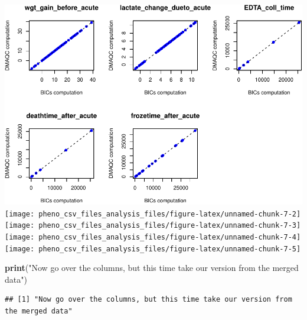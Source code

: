 \documentclass[]{article}
\newenvironment{Shaded}{\begin{snugshade}}{\end{snugshade}}
\newcommand{\KeywordTok}[1]{\textcolor[rgb]{0.13,0.29,0.53}{\textbf{#1}}}
\newcommand{\StringTok}[1]{\textcolor[rgb]{0.31,0.60,0.02}{#1}}
\newcommand{\NormalTok}[1]{#1}
\begin{document}
\includegraphics[width=0.5\linewidth,height=0.5\textheight]{pheno_csv_files_analysis_files/figure-latex/unnamed-chunk-7-1}
\texttt{[image: pheno\_csv\_files\_analysis\_files/figure-latex/unnamed-chunk-7-2]}
\texttt{[image: pheno\_csv\_files\_analysis\_files/figure-latex/unnamed-chunk-7-3]}
\texttt{[image: pheno\_csv\_files\_analysis\_files/figure-latex/unnamed-chunk-7-4]}
\texttt{[image: pheno\_csv\_files\_analysis\_files/figure-latex/unnamed-chunk-7-5]}

\begin{Shaded}
\begin{Highlighting}[]
\KeywordTok{print}\NormalTok{(}\StringTok{"Now go over the columns, but this time take our version from the merged data"}\NormalTok{)}
\end{Highlighting}
\end{Shaded}

\begin{verbatim}
## [1] "Now go over the columns, but this time take our version from the merged data"
\end{verbatim}
\end{document}
